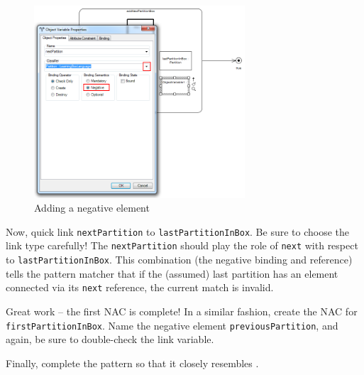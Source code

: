 \begin{stepbystep}
\begin{figure}[htbp]
\begin{center}
  \includegraphics[width=0.7\textwidth]{../../org.moflon.doc.handbook.03_storyDiagrams/08_growBox/visGBImages/ea_newNac}
  \caption{Adding a negative element}  
  \label{ea:sdm_negOV}
\end{center}
\end{figure}
 
\item Now, quick link \texttt{nextPartition} to \texttt{lastPartitionInBox}. Be sure to choose the link type carefully! The
\texttt{nextPartition} should play the role of \texttt{next} with respect to \texttt{lastPartitionInBox}. This combination (the negative binding and reference)
tells the pattern matcher that if the (assumed) last partition has an element connected via its \texttt{next} reference, the current match is invalid.

\item Great work -- the first NAC is complete! In a similar fashion, create the NAC for \texttt{firstPartitionInBox}. Name the
negative element \texttt{previousPartition}, and again, be sure to double-check the link variable.

\item Finally, complete the pattern so that it closely resembles . 


\end{stepbystep}

